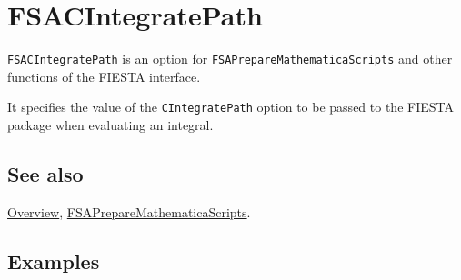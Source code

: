 \documentclass[../FeynHelpersManual.tex]{subfiles}
\begin{document}
\hypertarget{fsacintegratepath}{
\section{FSACIntegratePath}\label{fsacintegratepath}}

\texttt{FSACIntegratePath} is an option for
\texttt{FSAPrepareMathematicaScripts} and other functions of the FIESTA
interface.

It specifies the value of the \texttt{CIntegratePath} option to be
passed to the FIESTA package when evaluating an integral.

\subsection{See also}

\hyperlink{toc}{Overview},
\hyperlink{fsapreparemathematicascripts}{FSAPrepareMathematicaScripts}.

\subsection{Examples}
\end{document}
